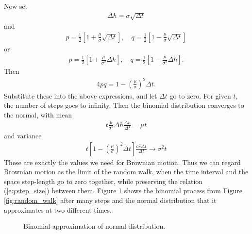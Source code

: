 \documentclass[\topdir/lecture\_notes.tex]{subfiles}
\begin{document}
Now set
\begin{align}
\Delta h=\sigma \sqrt{\Delta t} \label{eq:step_size}
\end{align}
and
\begin{align}
p=\frac{1}{2}\left[1+\frac{\mu}{\sigma} \sqrt{\Delta t}\right], \quad q=\frac{1}{2}\left[1-\frac{\mu}{\sigma} \sqrt{\Delta t}\right]
\end{align}
or
\begin{align}
p=\frac{1}{2}\left[1+\frac{\mu}{\sigma^{2}} \Delta h\right], \quad q=\frac{1}{2}\left[1-\frac{\mu}{\sigma^{2}} \Delta h\right]. 
\end{align}
Then
\begin{align*}
4 p q=1-\left(\frac{\mu}{\sigma}\right)^{2} \Delta t.
\end{align*}
Substitute these into the above expressions, and let $\Delta t$ go to zero. For given $t$, the number of steps goes to infinity. Then the binomial distribution converges to the normal, with mean
\begin{align*}
t \frac{\mu}{\sigma^{2}} \Delta h \frac{\Delta h}{\Delta t}=\mu t
\end{align*}
and variance
\begin{align*}
t\left[1-\left(\frac{\mu}{\sigma}\right)^{2} \Delta t\right] \frac{\sigma^{2} \Delta t}{\Delta t} \rightarrow \sigma^{2} t
\end{align*}
These are exactly the values we need for Brownian motion. Thus we can regard Brownian motion as the limit of the random walk, when the time interval and the space step-length go to zero together, while preserving the relation (\ref{eq:step_size}) between them.
Figure \ref{fig:binomial_normal} shows the binomial process from Figure \ref{fig:random_walk} after many steps and the normal distribution that it approximates at two different times.
\begin{figure}
    \centering
{}
\caption{Binomial approximation of normal distribution.}\label{fig:binomial_normal}
\end{figure}
\end{document}
